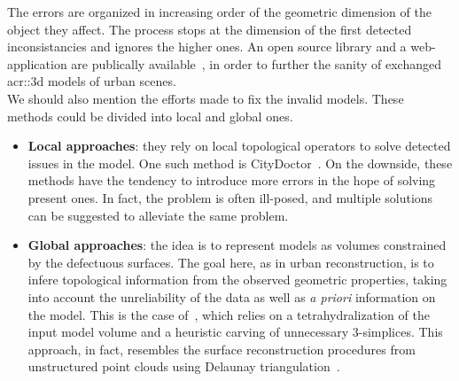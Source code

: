         The errors are organized in increasing order of the geometric dimension of the object they affect.
        The process stops at the dimension of the first detected inconsistancies and ignores the higher ones. 
        An open source library and a web-application are publically available~\parencite{ledoux2018val3dity}, in order to further the sanity of exchanged \gls{acr::3d} models of urban scenes.\\

        We should also mention the efforts made to fix the invalid models. 
        These methods could be divided into local and global ones.
        \begin{itemize}
            \item \textbf{Local approaches}: they rely on local topological operators to solve detected issues in the model.
                One such method is CityDoctor~\parencite{alam2014towards}.
                On the downside, these methods have the tendency to introduce more errors in the hope of solving present ones.
                In fact, the problem is often ill-posed, and multiple solutions can be suggested to alleviate the same problem.
            \item \textbf{Global approaches}: the idea is to represent models as volumes constrained by the defectuous surfaces.
            The goal here, as in urban reconstruction, is to infere topological information from the observed geometric properties, taking into account the unreliability of the data as well as \textit{a priori} information on the model.
            This is the case of~\textcite{zhao2013automatic}, which relies on a tetrahydralization of the input model volume and a heuristic carving of unnecessary 3-simplices.
            This approach, in fact, resembles the surface reconstruction procedures from unstructured point clouds using Delaunay triangulation~\parencite{cazals2006delaunay, berger2014state}.
        \end{itemize}

